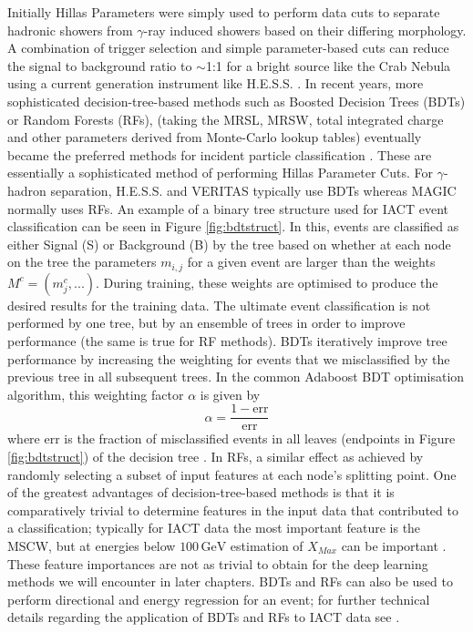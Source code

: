 Initially Hillas Parameters were simply used to perform data cuts to separate hadronic showers from $\gamma$-ray induced showers based on their differing morphology. A combination of trigger selection and simple parameter-based cuts can reduce the signal to background ratio to $\sim$1:1 for a bright source like the Crab Nebula using a current generation instrument like H.E.S.S. \cite{Berge07}. In recent years, more sophisticated decision-tree-based methods such as Boosted Decision Trees (BDTs) or Random Forests (RFs),  (taking the MRSL, MRSW, total integrated charge and other parameters derived from Monte-Carlo lookup tables) eventually became the preferred methods for incident particle classification \cite{hessbdt}. These are essentially a sophisticated method of performing Hillas Parameter Cuts. For $\gamma$-hadron separation, H.E.S.S. \cite{hessbdt} and VERITAS \cite{evdisp} typically use BDTs whereas MAGIC normally uses RFs. An example of a binary tree structure used for IACT event classification can be seen in Figure \ref{fig:bdtstruct}. In this, events are classified as either Signal (S) or Background (B) by the tree based on whether at each node on the tree the parameters $m_{i,j}$ for a given event are larger than the weights $M^c=(m^c_j,...)$. During training, these weights are optimised to produce the desired results for the training data. The ultimate event classification is not performed by one tree, but by  an ensemble of trees in order to improve performance (the same is true for RF methods). BDTs iteratively improve tree performance by increasing the weighting for events that we misclassified by the previous tree in all subsequent trees. In the common Adaboost BDT optimisation algorithm, this weighting factor $\alpha$ is given by 
\begin{equation}
    \alpha=\frac{1-\mathrm{err}}{\mathrm{err}}
\end{equation}
where $\mathrm{err}$ is the fraction of misclassified events in all leaves (endpoints in Figure \ref{fig:bdtstruct}) of the decision tree \cite{hessbdt}. In RFs, a similar effect as achieved by randomly selecting a subset of input features at each node’s splitting point. One of the greatest advantages of decision-tree-based methods is that it is comparatively trivial to determine features in the input data that contributed to a classification; typically for IACT data the most important feature is the MSCW, but at energies below $\mathrm{100\,GeV}$ estimation of $X_{Max}$ can be important \cite{hessbdt}. These feature importances are not as trivial to obtain for the deep learning methods we will encounter in later chapters. BDTs and RFs can also be used to perform directional and energy regression for an event; for further technical details regarding the application of BDTs and RFs to IACT data see \cite{Sitarek1i} \cite{magictime} \cite{hessbdt} \cite{supermagictime}.

